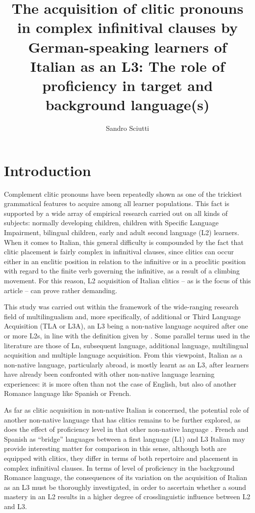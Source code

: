 \documentclass[output=paper,modfonts,nonflat,newtxmath]{langsci/langscibook}
\author{Sandro Sciutti\affiliation{University of Genoa}}
\title{The acquisition of clitic pronouns in complex infinitival clauses by German-speaking learners of Italian as an L3: The role of proficiency in target and background language(s)}
\begin{document}
\maketitle
{}
\newpage
\section{Introduction}%
\label{sec:sciutti:1}

Complement clitic pronouns have been repeatedly shown as one of the trickiest grammatical features to acquire among all learner populations. This fact is supported by a wide array of empirical research carried out on all kinds of subjects: normally developing children, children with Specific Language Impairment, bilingual children, early and adult second language (L2) learners. When it comes to Italian, this general difficulty is compounded by the fact that clitic placement is fairly complex in infinitival clauses, since clitics can occur either in an enclitic position in relation to the infinitive or in a proclitic position with regard to the finite verb governing the infinitive, as a result of a climbing movement. For this reason, L2 acquisition of Italian clitics – as is the focus of this article – can prove rather demanding.

This study was carried out within the framework of the wide-ranging research field of multilingualism and, more specifically, of additional or Third Language Acquisition (TLA or L3A), an L3 being a non-native language acquired after one or more L2s, in line with the definition given by \citet[97]{Hammarberg2010}. Some parallel terms used in the literature are those of Ln, subsequent language, additional language, multilingual acquisition and multiple language acquisition. From this viewpoint, Italian as a non-native language, particularly abroad, is mostly learnt as an L3, after learners have already been confronted with other non-native language learning experiences: it is more often than not the case of English, but also of another Romance language like Spanish or French.

As far as clitic acquisition in non-native Italian is concerned, the potential role of another non-native language that has clitics remains to be further explored, as does the effect of proficiency level in that other non-native language \citep[238--239]{Giannini2008}. French and Spanish as “bridge” languages between a first language (L1) and L3 Italian may provide interesting matter for comparison in this sense, although both are equipped with clitics, they differ in terms of both repertoire and placement in complex infinitival clauses. In terms of level of proficiency in the background Romance language, the consequences of its variation on the acquisition of Italian as an L3 must be thoroughly investigated, in order to ascertain whether a sound mastery in an L2 results in a higher degree of crosslinguistic influence between L2 and L3.
\end{document}
